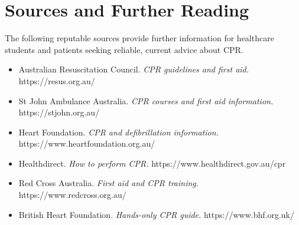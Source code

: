\section*{Sources and Further Reading}
The following reputable sources provide further information for healthcare students and patients seeking reliable, current advice about CPR.

\begin{itemize}
    \item Australian Resuscitation Council. \textit{CPR guidelines and first aid.} https://resus.org.au/
    \item St John Ambulance Australia. \textit{CPR courses and first aid information.} https://stjohn.org.au/
    \item Heart Foundation. \textit{CPR and defibrillation information.} https://www.heartfoundation.org.au/
    \item Healthdirect. \textit{How to perform CPR.} https://www.healthdirect.gov.au/cpr
    \item Red Cross Australia. \textit{First aid and CPR training.} https://www.redcross.org.au/
    \item British Heart Foundation. \textit{Hands-only CPR guide.} https://www.bhf.org.uk/
\end{itemize}

